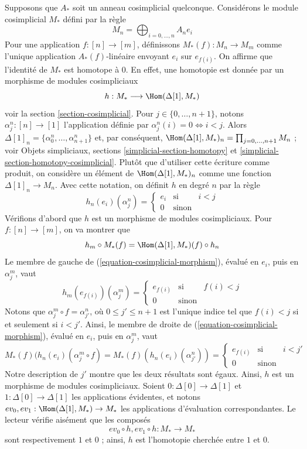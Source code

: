 \begin{example}
\label{example-cosimplicial-module}
Supposons que $A_*$ soit un anneau cosimplicial quelconque.
Considérons le module cosimplicial $M_*$ défini par la règle
$$
M_n = \bigoplus\nolimits_{i = 0, ..., n} A_n e_i
$$
Pour une application $f : [n] \to [m]$, définissons $M_*(f) : M_n \to M_m$
comme l'unique application $A_*(f)$-linéaire envoyant $e_i$ sur $e_{f(i)}$.
On affirme que l'identité de $M_*$ est homotope à $0$.
En effet, une homotopie est donnée par un morphisme de modules cosimpliciaux
$$
h : M_* \longrightarrow \Hom(\Delta[1], M_*)
$$
voir la section \ref{section-cosimplicial}.
Pour $j \in \{0, \ldots, n + 1\}$, notons $\alpha^n_j : [n] \to [1]$ l'application
définie par $\alpha^n_j(i) = 0 \Leftrightarrow i < j$. Alors
$\Delta[1]_n = \{\alpha^n_0, \ldots, \alpha^n_{n + 1}\}$ et, par conséquent,
$\Hom(\Delta[1], M_*)_n = \prod_{j = 0, \ldots, n + 1} M_n$ ; voir
Objets simpliciaux, sections \ref{simplicial-section-homotopy} et
\ref{simplicial-section-homotopy-cosimplicial}. Plutôt que d'utiliser
cette écriture comme produit, on considère un élément
de $\Hom(\Delta[1], M_*)_n$ comme une fonction $\Delta[1]_n \to M_n$.
Avec cette notation, on définit $h$ en degré $n$ par la règle
$$
h_n(e_i)(\alpha^n_j) =
\left\{
\begin{matrix}
e_{i} & \text{si} & i < j \\
0 & \text{sinon} 
\end{matrix}
\right.
$$
Vérifions d'abord que $h$ est un morphisme de modules cosimpliciaux. Pour
$f : [n] \to [m]$, on va montrer que
\begin{equation}
\label{equation-cosimplicial-morphism}
h_m \circ M_*(f) = \Hom(\Delta[1], M_*)(f) \circ h_n
\end{equation}
Le membre de gauche de (\ref{equation-cosimplicial-morphism}), évalué en
$e_i$, puis en $\alpha^m_j$, vaut
$$
h_m(e_{f(i)})(\alpha^m_j) =
\left\{
\begin{matrix}
e_{f(i)} & \text{si} & f(i) < j \\
0 & \text{sinon}
\end{matrix}
\right.
$$
Notons que $\alpha^m_j \circ f = \alpha^n_{j'}$, où
$0 \leq j' \leq n + 1$ est l'unique indice tel que $f(i) < j$
si et seulement si $i < j'$. Ainsi, le membre de droite de
(\ref{equation-cosimplicial-morphism}), évalué en $e_i$,
puis en $\alpha^m_j$, vaut
$$
M_*(f)(h_n(e_i)(\alpha^m_j \circ f) =
M_*(f)(h_n(e_i)(\alpha^n_{j'})) =
\left\{
\begin{matrix}
e_{f(i)} & \text{si} & i < j' \\
0 & \text{sinon} 
\end{matrix}
\right.
$$
Notre description de $j'$ montre que les deux résultats sont égaux.
Ainsi, $h$ est un morphisme de modules cosimpliciaux.
Soient $0 : \Delta[0] \to \Delta[1]$ et
$1 : \Delta[0] \to \Delta[1]$ les applications évidentes, et notons
$ev_0, ev_1 : \Hom(\Delta[1], M_*) \to M_*$ les applications
d'évaluation correspondantes. Le lecteur vérifie aisément que
les composés
$$
ev_0 \circ h, ev_1 \circ h : M_* \longrightarrow M_*
$$
sont respectivement $1$ et $0$ ; ainsi, $h$ est l'homotopie cherchée entre
$1$ et $0$.
\end{example}


